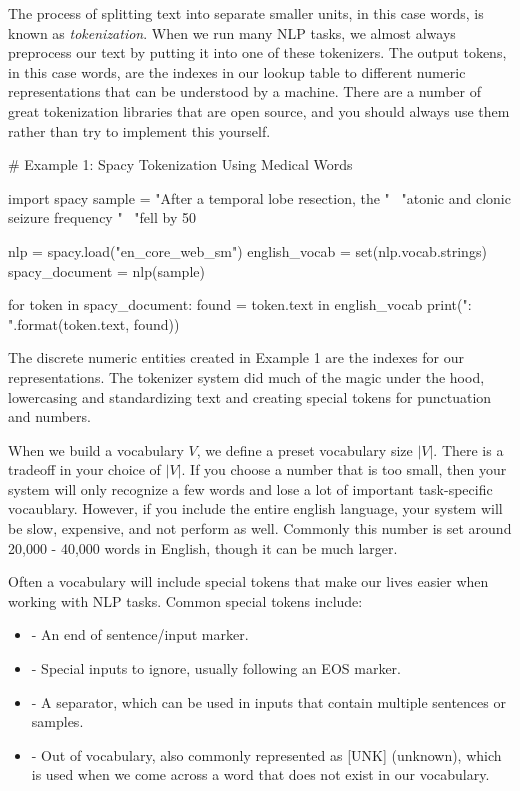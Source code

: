 The process of splitting text into separate smaller units, in this case words, is known as \textit{tokenization}.
When we run many NLP tasks, we almost always preprocess our text by putting it into one of these tokenizers.
The output tokens, in this case words, are the indexes in our lookup table to different numeric representations that can be understood by a machine.
There are a number of great tokenization libraries that are open source, and you should always use them rather than try to implement this yourself.

\begin{python}
  # Example 1: Spacy Tokenization Using Medical Words

  import spacy
  sample = "After a temporal lobe resection, the " \
           "atonic and clonic seizure frequency " \
           "fell by 50%

  nlp = spacy.load("en_core_web_sm")
  english_vocab = set(nlp.vocab.strings)
  spacy_document = nlp(sample)

  for token in spacy_document:
      found = token.text in english_vocab
      print("{}: {}".format(token.text, found))
\end{python}

The discrete numeric entities created in Example 1 are the indexes for our representations.
The tokenizer system did much of the magic under the hood, lowercasing and standardizing text and creating special tokens for punctuation and numbers.

When we build a vocabulary $V$, we define a preset vocabulary size $|V|$. There is a tradeoff in your choice of $|V|$.
If you choose a number that is too small, then your system will only recognize a few words and lose a lot of important task-specific vocaublary.
However, if you include the entire english language, your system will be slow, expensive, and not perform as well.
Commonly this number is set around 20,000 - 40,000 words in English, though it can be much larger.

Often a vocabulary will include special tokens that make our lives easier when working with NLP tasks.
Common special tokens include:
\begin{itemize}
  \item \pythoninline{[EOS]} - An end of sentence/input marker.
  \item \pythoninline{[PAD]} - Special inputs to ignore, usually following an EOS marker.
  \item \pythoninline{[SEP]} - A separator, which can be used in inputs that contain multiple sentences or samples.
  \item \pythoninline{[OOV]} - Out of vocabulary, also commonly represented as [UNK] (unknown), which is used when we come across a word that does not exist in our vocabulary.
\end{itemize}

